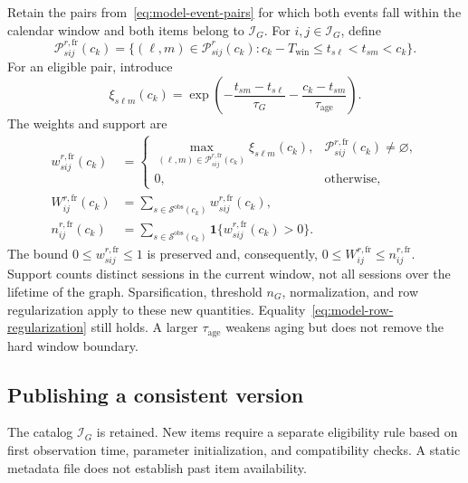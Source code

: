 \documentclass[12pt,a4paper]{article}
\newcommand{\ind}{\mathbf 1}
\theoremstyle{plainru}
\begin{document}
Retain the pairs from~\eqref{eq:model-event-pairs} for which both events
fall within the calendar window and both items belong to
$\mathcal I_G$. For $i,j\in\mathcal I_G$, define
\begin{equation}\label{eq:freshness-pairs}
\mathcal P^{r,\mathrm{fr}}_{sij}(c_k)
=\{(\ell,m)\in\mathcal P^r_{sij}(c_k):
c_k-T_{\mathrm{win}}\le t_{s\ell}<t_{sm}<c_k\}.
\end{equation}
For an eligible pair, introduce
\begin{equation}\label{eq:freshness-pair-weight}
\xi_{s\ell m}(c_k)=
\exp\!\left(-\frac{t_{sm}-t_{s\ell}}{\tau_G}
            -\frac{c_k-t_{sm}}{\tau_{\mathrm{age}}}\right).
\end{equation}
The weights and support are
\begin{align}
w^{r,\mathrm{fr}}_{sij}(c_k)
&=
\begin{cases}
\displaystyle\max_{(\ell,m)\in\mathcal P^{r,\mathrm{fr}}_{sij}(c_k)}
\xi_{s\ell m}(c_k),
&\mathcal P^{r,\mathrm{fr}}_{sij}(c_k)\ne\varnothing,\\
0,&\text{otherwise},
\end{cases}\label{eq:freshness-session}\\
W^{r,\mathrm{fr}}_{ij}(c_k)
&=\sum_{s\in\mathcal S^{\mathrm{obs}}(c_k)}
w^{r,\mathrm{fr}}_{sij}(c_k),\nonumber\\
n^{r,\mathrm{fr}}_{ij}(c_k)
&=\sum_{s\in\mathcal S^{\mathrm{obs}}(c_k)}
\ind\{w^{r,\mathrm{fr}}_{sij}(c_k)>0\}.
\label{eq:freshness-weight}
\end{align}
The bound $0\le w^{r,\mathrm{fr}}_{sij}\le1$ is preserved and, consequently,
$0\le W^{r,\mathrm{fr}}_{ij}\le n^{r,\mathrm{fr}}_{ij}$.
Support counts distinct sessions in the current window, not all sessions
over the lifetime of the graph. Sparsification, threshold $n_G$,
normalization, and row regularization apply to these new quantities.
Equality~\eqref{eq:model-row-regularization} still holds.
A larger $\tau_{\mathrm{age}}$ weakens aging but does not remove
the hard window boundary.

\subsection{Publishing a consistent version}\label{sec:freshness-publication}

The catalog $\mathcal I_G$ is retained. New items require a separate
eligibility rule based on first observation time, parameter initialization,
and compatibility checks. A static metadata file does not establish
past item availability.
\end{document}
